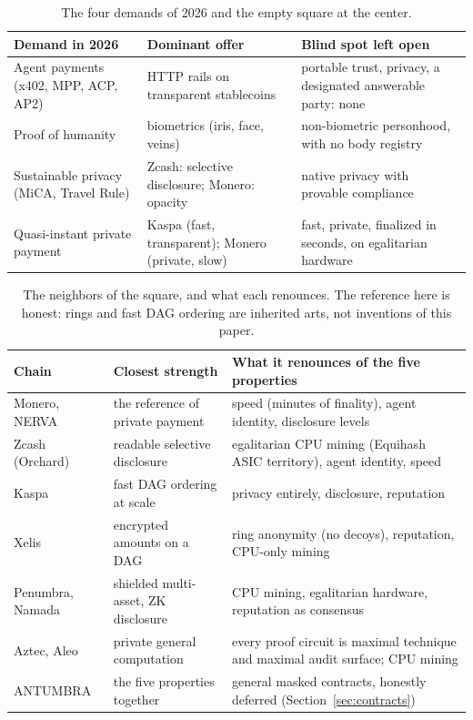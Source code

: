 \begin{table}[htbp]
\centering
\small
\caption{The four demands of 2026 and the empty square at the center.}
\label{tab:demands}
\begin{tabularx}{\textwidth}{@{}L{4.1cm}YY@{}}
\toprule
Demand in 2026 & Dominant offer & Blind spot left open \\
\midrule
Agent payments (x402, MPP, ACP, AP2) & HTTP rails on transparent stablecoins &
portable trust, privacy, a designated answerable party: none \\
Proof of humanity & biometrics (iris, face, veins) &
non-biometric personhood, with no body registry \\
Sustainable privacy (MiCA, Travel Rule) & Zcash: selective disclosure; Monero: opacity &
native privacy with provable compliance \\
Quasi-instant private payment & Kaspa (fast, transparent); Monero (private, slow) &
fast, private, finalized in seconds, on egalitarian hardware \\
\bottomrule
\end{tabularx}
\end{table}

\begin{table}[htbp]
\centering
\small
\caption{The neighbors of the square, and what each renounces. The
reference here is honest: rings and fast DAG ordering are inherited arts,
not inventions of this paper.}
\label{tab:neighbors}
\begin{tabularx}{\textwidth}{@{}L{3.2cm}Y Y@{}}
\toprule
Chain & Closest strength & What it renounces of the five properties \\
\midrule
Monero, NERVA & the reference of private payment & speed (minutes of finality), agent identity, disclosure levels \\
Zcash (Orchard) & readable selective disclosure & egalitarian CPU mining (Equihash ASIC territory), agent identity, speed \\
Kaspa & fast DAG ordering at scale & privacy entirely, disclosure, reputation \\
Xelis & encrypted amounts on a DAG & ring anonymity (no decoys), reputation, CPU-only mining \\
Penumbra, Namada & shielded multi-asset, ZK disclosure & CPU mining, egalitarian hardware, reputation as consensus \\
Aztec, Aleo & private general computation & every proof circuit is maximal technique and maximal audit surface; CPU mining \\
ANTUMBRA & the five properties together & general masked contracts, honestly deferred (Section~\ref{sec:contracts}) \\
\bottomrule
\end{tabularx}
\end{table}

